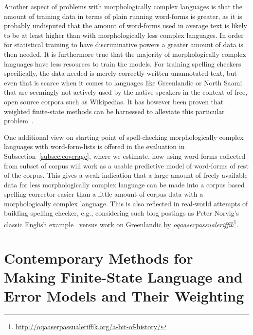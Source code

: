 \documentclass[a4paper,12pt]{article}
\begin{document}
Another aspect of problems with morphologically complex languages is that the
amount of training data in terms of plain running word-forms is greater, as it
is probably undisputed that the amount of word-forms used in average text is
likely to be at least higher than with morphologically less complex languages.
In order for statistical training to have discriminative powers a greater
amount of data is then needed. It is furthermore true that the majority of
morphologically complex languages have less resources to train the models.  For
training spelling checkers specifically, the data needed is merely correctly
written unannotated text, but even that is scarce when it comes to languages
like Greenlandic or North Saami that are seemingly not actively used by the
native speakers in the context of free, open source corpora such as Wikipedias.
It has however been proven that weighted finite-state methods can be harnessed
to alleviate this particular problem~\cite[]{pirinen/2010/lrec}.

One additional view on starting point of spell-checking morphologically complex
languages with word-form-lists is offered in the evaluation in
Subsection~\ref{subsec:coverage}, where we estimate, how using word-forms
collected from subset of corpus will work as a usable predictive model of
word-forms of rest of the corpus. This gives a weak indication that a large
amount of freely available data for less morphologically complex language can
be made into a corpus based spelling-corrector easier than a little amount of
corpus data with a morphologically complex language.  This is also reflected in
real-world attempts of building spelling checker, e.g., considering such blog
postings as Peter Norvig's classic English example~\cite[]{norvig/2010} versus
work on Greenlandic by
\emph{oqaaserpassualeriffik}\footnote{\url{http://oqaaserpassualeriffik.org/a-bit-of-history/}}.

\section{Contemporary Methods for Making Finite-State Language and Error Models
and Their Weighting}
\label{sec:methods}
\end{document}
